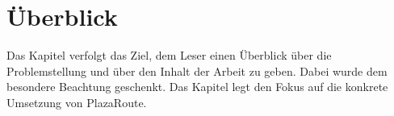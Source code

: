 \section{Überblick}
\label{sec:Überblick}
Das Kapitel  verfolgt das Ziel, dem Leser einen Überblick über die Problemstellung und über den Inhalt der Arbeit zu geben. Dabei wurde dem  besondere Beachtung geschenkt. Das Kapitel  legt den Fokus auf die konkrete Umsetzung von PlazaRoute.